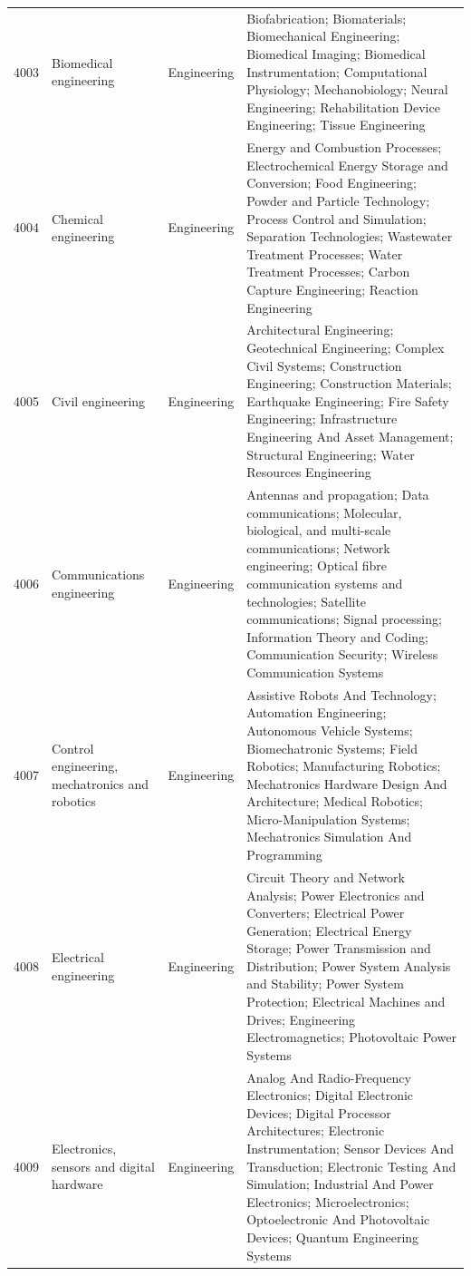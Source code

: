 \begin{longtable}{r p{2.45cm} p{2.55cm} p{6.15cm}}
4003 & Biomedical engineering & Engineering & Biofabrication; Biomaterials; Biomechanical Engineering; Biomedical Imaging; Biomedical Instrumentation; Computational Physiology; Mechanobiology; Neural Engineering; Rehabilitation Device Engineering; Tissue Engineering \\
4004 & Chemical engineering & Engineering & Energy and Combustion Processes; Electrochemical Energy Storage and Conversion; Food Engineering; Powder and Particle Technology; Process Control and Simulation; Separation Technologies; Wastewater Treatment Processes; Water Treatment Processes; Carbon Capture Engineering; Reaction Engineering \\
4005 & Civil engineering & Engineering & Architectural Engineering; Geotechnical Engineering; Complex Civil Systems; Construction Engineering; Construction Materials; Earthquake Engineering; Fire Safety Engineering; Infrastructure Engineering And Asset Management; Structural Engineering; Water Resources Engineering \\
4006 & Communications engineering & Engineering & Antennas and propagation; Data communications; Molecular, biological, and multi-scale communications; Network engineering; Optical fibre communication systems and technologies; Satellite communications; Signal processing; Information Theory and Coding; Communication Security; Wireless Communication Systems \\
4007 & Control engineering, mechatronics and robotics & Engineering & Assistive Robots And Technology; Automation Engineering; Autonomous Vehicle Systems; Biomechatronic Systems; Field Robotics; Manufacturing Robotics; Mechatronics Hardware Design And Architecture; Medical Robotics; Micro-Manipulation Systems; Mechatronics Simulation And Programming \\
4008 & Electrical engineering & Engineering & Circuit Theory and Network Analysis; Power Electronics and Converters; Electrical Power Generation; Electrical Energy Storage; Power Transmission and Distribution; Power System Analysis and Stability; Power System Protection; Electrical Machines and Drives; Engineering Electromagnetics; Photovoltaic Power Systems \\
4009 & Electronics, sensors and digital hardware & Engineering & Analog And Radio-Frequency Electronics; Digital Electronic Devices; Digital Processor Architectures; Electronic Instrumentation; Sensor Devices And Transduction; Electronic Testing And Simulation; Industrial And Power Electronics; Microelectronics; Optoelectronic And Photovoltaic Devices; Quantum Engineering Systems \\

\end{longtable}
